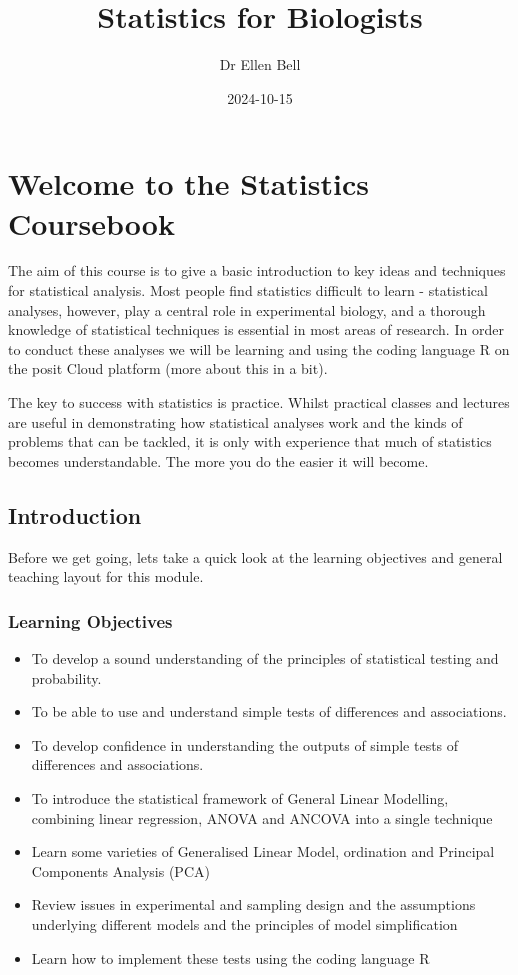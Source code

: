 \documentclass[
]{book}
\title{Statistics for Biologists}
\author{Dr Ellen Bell}
\date{2024-10-15}
\providecommand{\tightlist}{%
  \setlength{\itemsep}{0pt}\setlength{\parskip}{0pt}}
\begin{document}
\maketitle

{
\setcounter{tocdepth}{1}
\tableofcontents
}
\chapter{Welcome to the Statistics Coursebook}\label{c1}

The aim of this course is to give a basic introduction to key ideas and techniques for statistical analysis. Most people find statistics difficult to learn - statistical analyses, however, play a central role in experimental biology, and a thorough knowledge of statistical techniques is essential in most areas of research. In order to conduct these analyses we will be learning and using the coding language R on the posit Cloud platform (more about this in a bit).

The key to success with statistics is practice. Whilst practical classes and lectures are useful in demonstrating how statistical analyses work and the kinds of problems that can be tackled, it is only with experience that much of statistics becomes understandable. The more you do the easier it will become.

\section{Introduction}\label{introduction}

Before we get going, lets take a quick look at the learning objectives and general teaching layout for this module.

\subsection{Learning Objectives}\label{learning-objectives}

\begin{itemize}
\tightlist
\item
  To develop a sound understanding of the principles of statistical testing and probability.
\item
  To be able to use and understand simple tests of differences and associations.
\item
  To develop confidence in understanding the outputs of simple tests of differences and associations.
\item
  To introduce the statistical framework of General Linear Modelling, combining linear regression, ANOVA and ANCOVA into a single technique
\item
  Learn some varieties of Generalised Linear Model, ordination and Principal Components Analysis (PCA)
\item
  Review issues in experimental and sampling design and the assumptions underlying different models and the principles of model simplification
\item
  Learn how to implement these tests using the coding language R
\end{itemize}
\end{document}

